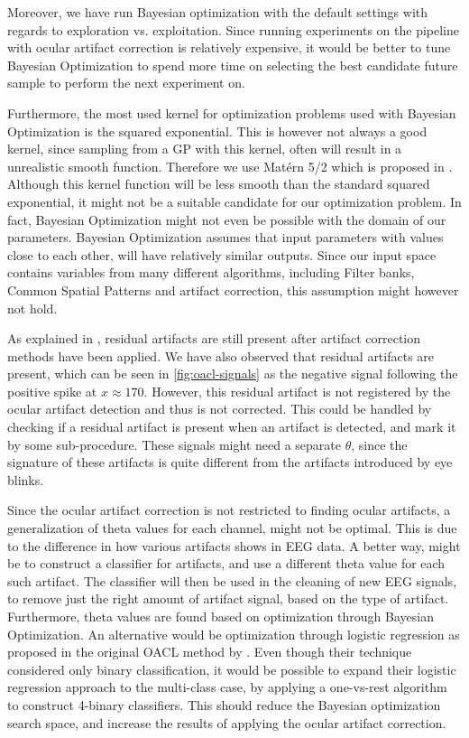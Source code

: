 Moreover, we have run Bayesian optimization with the default settings with regards to exploration vs. exploitation. Since running experiments on the pipeline with ocular artifact correction is relatively expensive, it would be better to tune Bayesian Optimization to spend more time on selecting the best candidate future sample to perform the next experiment on. 

Furthermore, the most used kernel for optimization problems used with Bayesian Optimization is the squared exponential. This is however not always a good kernel, since sampling from a GP with this kernel, often will result in a unrealistic smooth function. Therefore we use Matérn 5/2 which is proposed in \citep{snoek2012practical}. Although this kernel function will be less smooth than the standard squared exponential, it might not be a suitable candidate for our optimization problem. In fact, Bayesian Optimization might not even be possible with the domain of our parameters. Bayesian Optimization assumes that input parameters with values close to each other, will have relatively similar outputs. Since our input space contains variables from many different algorithms, including Filter banks, Common Spatial Patterns and artifact correction, this assumption might however not hold. 

As explained in \cite{hoffmann2008correction}, residual artifacts are still present after artifact correction methods have been applied. We have also observed that residual artifacts are present, which can be seen in \cref{fig:oacl-signals} as the negative signal following the positive spike at $x \approx 170$. However, this residual artifact is not registered by the ocular artifact detection and thus is not corrected. This could be handled by checking if a residual artifact is present when an artifact is detected, and mark it by some sub-procedure. These signals might need a separate $\theta$, since the signature of these artifacts is quite different from the artifacts introduced by eye blinks.

Since the ocular artifact correction is not restricted to finding ocular artifacts, a generalization of theta values for each channel, might not be optimal. This is due to the difference in how various artifacts shows in EEG data. A better way, might be to construct a classifier for artifacts, and use a different theta value for each such artifact. The classifier will then be used in the cleaning of new EEG signals, to remove just the right amount of artifact signal, based on the type of artifact. Furthermore, theta values are found based on optimization through Bayesian Optimization. An alternative would be optimization through logistic regression as proposed in the original OACL method by \citet{li2015ocular}. Even though their technique considered only binary classification, it would be possible to expand their logistic regression approach to the multi-class case, by applying a one-vs-rest algorithm to construct 4-binary classifiers. This should reduce the Bayesian optimization search space, and increase the results of applying the ocular artifact correction.

